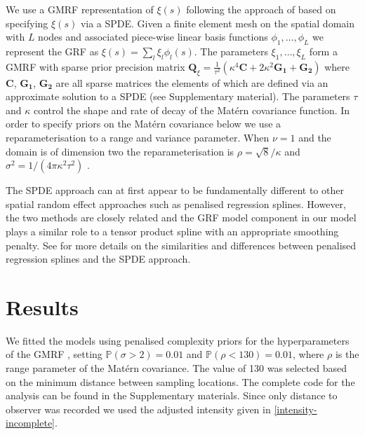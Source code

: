 \documentclass{stylefile16/statsoc}
\newcommand{\bm}{\boldsymbol}  %
\begin{document}
We use a GMRF representation of $\xi(s)$ following the approach of \cite{lindgren_explicit_2011} based on specifying $\xi(s)$ via a SPDE.  Given a finite element mesh on the spatial domain with $L$ nodes and associated piece-wise linear basis functions $\phi_1, \ldots, \phi_L$ we represent the GRF as $\xi(s) = \sum_l \xi_l \phi_l(s)$.  The parameters $\xi_1, \ldots, \xi_L$ form a GMRF with sparse prior precision matrix $\bm{Q}_{\xi} = \frac{1}{\tau^2}\left(\kappa^4\bm{C} + 2\kappa^2\bm{G_1} + \bm{G_2}\right)$ where $\bm{C}$, $\bm{G_1}$, $\bm{G_2}$ are all sparse matrices the elements of which are defined via an approximate solution to a SPDE (see Supplementary material). The parameters $\tau$ and $\kappa$ control the shape and rate of decay of the Mat\'ern covariance function. In order to specify priors on the Mat\'ern covariance below we use a reparameterisation to a range and variance parameter.  When $\nu = 1$ and the domain is of dimension two the reparameterisation is $\rho = \sqrt{8} / \kappa$ and $\sigma^2 = 1 / (4\pi\kappa^2\tau^2)$ \citep{blangiardo_spatial_2013}.

The SPDE approach can at first appear to be fundamentally different to other spatial random effect approaches such as penalised regression splines.  However, the two methods are closely related and the GRF model component in our model plays a similar role to a tensor product spline with an appropriate smoothing penalty.  See \cite{yue_bayesian_2014, miller_understanding_2019} for more details on the similarities and differences between penalised regression splines and the SPDE approach.

\section{Results}
\label{sec-results}

We fitted the models using penalised complexity priors for the hyperparameters of the GMRF \citep{simpson_penalising_2017}, setting $\mathbb{P}(\sigma > 2) = 0.01$ and $\mathbb{P}(\rho < 130) = 0.01$, where $\rho$ is the range parameter of the Mat\'ern covariance.  The value of 130 was selected based on the minimum distance between sampling locations.  The complete code for the analysis can be found in the Supplementary materials.  Since only distance to observer was recorded we used the adjusted intensity given in \eqref{intensity-incomplete}.
\end{document}
